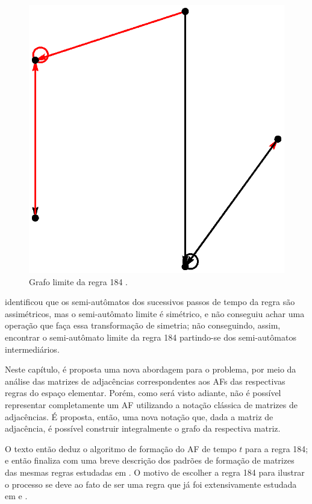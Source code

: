 \documentclass[12pt,a4paper]{article}
\begin{document}
\begin{figure}[htp]
\begin{center}
\includegraphics[scale=0.8]{img/limit184.eps}
\caption{Grafo limite da regra 184 .}
\label{fig:limit184}
\end{center}
\end{figure}

 identificou que os semi-autômatos dos sucessivos passos de
tempo da regra são assimétricos, mas o semi-autômato limite é simétrico, e não
conseguiu achar uma operação que faça essa transformação de simetria;
não conseguindo, assim, encontrar o semi-autômato limite da regra 184
partindo-se dos semi-autômatos intermediários.

Neste capítulo, é proposta uma nova abordagem para o problema, por meio da
análise das matrizes de adjacências correspondentes aos AFs
das respectivas regras do espaço elementar. Porém, como será visto adiante,
não é possível representar completamente um AF utilizando a
notação clássica de matrizes de adjacências. É proposta, então, uma
nova notação que, dada a matriz de adjacência, é possível construir
integralmente o grafo da respectiva matriz.

O texto então deduz o algoritmo de formação do AF
de tempo $t$ para a regra 184; e então finaliza com uma breve
descrição dos padrões de formação de matrizes das mesmas regras
estudadas em . O motivo de escolher
a regra 184 para ilustrar o processo se deve ao fato de ser
uma regra que já foi extensivamente estudada em 
e .
\end{document}
